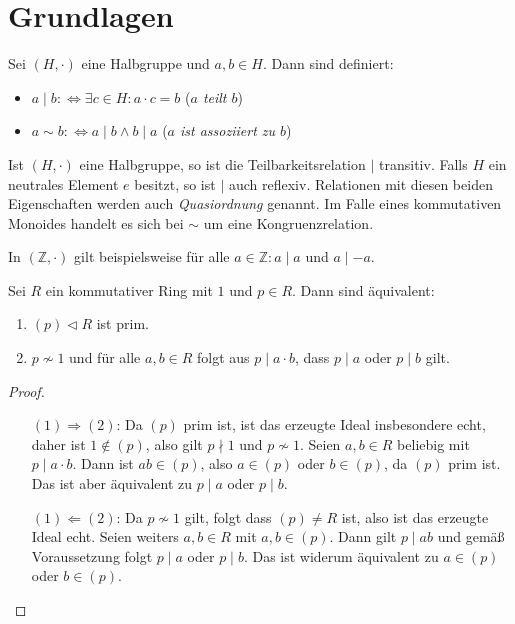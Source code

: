 \section{Grundlagen}

\begin{definition}
    Sei $(H,\cdot)$ eine Halbgruppe und $a,b\in H$. Dann sind definiert:
    \begin{itemize}
        \item $a\mid b:\Leftrightarrow \exists c\in H:a\cdot c=b$ \tab (\emph{$a$ teilt $b$})
        \item $a\sim b:\Leftrightarrow a\mid b\land b\mid a$ \tab (\emph{$a$ ist assoziiert zu $b$})
    \end{itemize}
\end{definition}

\begin{remark}
    Ist $(H,\cdot)$ eine Halbgruppe, so ist die Teilbarkeitsrelation $\mid$ transitiv.
    Falls $H$ ein neutrales Element $e$ besitzt, so ist $\mid$ auch reflexiv. Relationen mit diesen beiden Eigenschaften
    werden auch \emph{Quasiordnung} genannt. Im Falle eines kommutativen Monoides handelt es sich bei
    $\sim$ um eine Kongruenzrelation.
\end{remark}

\begin{example}
    In $(\mathbb{Z},\cdot)$ gilt beispielsweise für alle $a\in\mathbb{Z}:a\mid a$ und $a\mid -a$. 
\end{example}

\begin{proposition}
    Sei $R$ ein kommutativer Ring mit $1$ und $p\in R$. Dann sind äquivalent:
    \begin{enumerate}
        \item $(p)\vartriangleleft R$ ist prim.
        \item $p\not\sim 1$ und für alle $a,b\in R$ folgt
        aus $p\mid a\cdot b$, dass $p\mid a$ oder $p\mid b$ gilt.
    \end{enumerate}
\end{proposition}

\begin{proof}{\ }
    \begin{itemize}[leftmargin=2.5cm] 
        \item[$(1) \Rightarrow (2)$:]Da $(p)$ prim ist, ist das erzeugte Ideal insbesondere echt, daher ist $1\not\in (p)$, also gilt $p \nmid 1$ und $p\not\sim 1$.
        Seien $a,b\in R$ beliebig mit $p\mid a\cdot b$. Dann ist $ab\in (p)$, also $a\in(p)$ oder $b\in(p)$, da $(p)$ prim ist.
        Das ist aber äquivalent zu $p\mid a$ oder $p\mid b$.
        \item[$(1) \Leftarrow (2)$:]Da $p\not\sim 1$ gilt, folgt dass $(p)\neq R$ ist, also ist das erzeugte Ideal echt.
        Seien weiters $a,b\in R$ mit $a,b\in (p)$. Dann gilt $p\mid ab$ und gemäß Voraussetzung folgt $p\mid a$ oder $p\mid b$.
        Das ist widerum äquivalent zu $a\in(p)$ oder $b\in(p)$.
    \end{itemize}
\end{proof}


